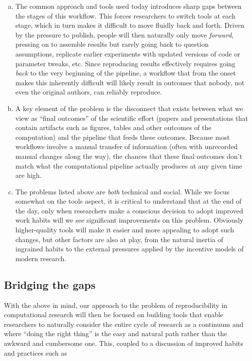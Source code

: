 \documentclass[ChapterTOCs,krantz2]{krantz} %
\begin{document}
\begin{enumerate}[(a)]
  \item The common approach and tools used today introduces sharp gaps between
    the stages of this workflow.  This forces researchers to switch tools at
    each stage, which in turn makes it difficult to move fluidly back and
    forth.  Driven by the pressure to publish, people will then naturally only
    move \emph{forward}, pressing on to assemble results but rarely going back
    to question assumptions, replicate earlier experiments with updated
    versions of code or parameter tweaks, etc.  Since reproducing results
    effectively requires going \emph{back} to the very beginning of the
    pipeline, a workflow that from the onset makes this inherently difficult
    will likely result in outcomes that nobody, not even the original authors,
    can reliably reproduce.

  \item A key element of the problem is the disconnect that exists between what
    we view as ``final outcomes'' of the scientific effort (papers and
    presentations that contain artifacts such as figures, tables and other
    outcomes of the computation) and the pipeline that feeds these outcomes.
    Because most workflows involve a manual transfer of information (often with
    unrecorded manual changes along the way), the chances that these final
    outcomes don't match what the computational pipeline actually produces at
    any given time are high.

  \item The problems listed above are \emph{both} technical and social.  While
    we focus somewhat on the tools aspect, it is critical to understand that at
    the end of the day, only when researchers make a conscious decision to
    adopt improved work habits will we see significant improvements on this
    problem.  Obviously higher-quality tools will make it easier and more
    appealing to adopt such changes, but other factors are also at play, from
    the natural inertia of ingrained habits to the external pressures applied
    by the incentive models of modern research.
\end{enumerate}


\subsection{Bridging the gaps}

With the above in mind, our approach to the problem of reproducibility in
computational research will then be focused on building tools that enable
researchers to naturally consider the entire cycle of research as a continuum
and where ``doing the right thing'' is the easy and natural path rather than
the awkward and cumbersome one.  This, coupled to a discussion of improved
habits and practices such as 
\end{document}

